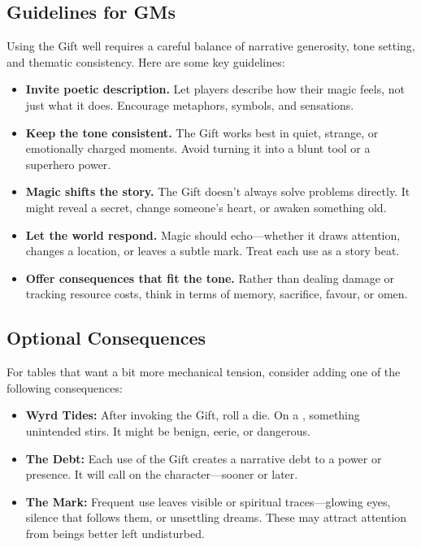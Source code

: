 \subsection{Guidelines for GMs}

Using the Gift well requires a careful balance of narrative generosity, tone setting, and thematic consistency. Here are some key guidelines:

\begin{itemize}\raggedright
    \item \textbf{Invite poetic description.} Let players describe how their magic feels, not just what it does. Encourage metaphors, symbols, and sensations.
    \item \textbf{Keep the tone consistent.} The Gift works best in quiet, strange, or emotionally charged moments. Avoid turning it into a blunt tool or a superhero power.
    \item \textbf{Magic shifts the story.} The Gift doesn’t always solve problems directly. It might reveal a secret, change someone’s heart, or awaken something old.
    \item \textbf{Let the world respond.} Magic should echo—whether it draws attention, changes a location, or leaves a subtle mark. Treat each use as a story beat.
    \item \textbf{Offer consequences that fit the tone.} Rather than dealing damage or tracking resource costs, think in terms of memory, sacrifice, favour, or omen.
\end{itemize}

\subsection{Optional Consequences}

For tables that want a bit more mechanical tension, consider adding one of the following consequences:

\begin{itemize}
    \item \textbf{Wyrd Tides:} After invoking the Gift, roll a die. On a \FudgeDie{-}, something unintended stirs. It might be benign, eerie, or dangerous.
    \item \textbf{The Debt:} Each use of the Gift creates a narrative debt to a power or presence. It will call on the character—sooner or later.
    \item \textbf{The Mark:} Frequent use leaves visible or spiritual traces—glowing eyes, silence that follows them, or unsettling dreams. These may attract attention from beings better left undisturbed.
\end{itemize}

